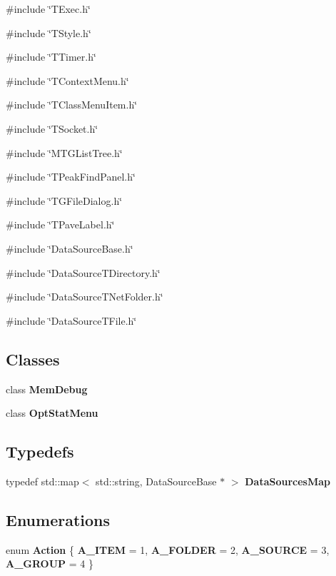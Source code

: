 {\ttfamily \#include \char`\"{}TExec.h\char`\"{}}\par
{\ttfamily \#include \char`\"{}TStyle.h\char`\"{}}\par
{\ttfamily \#include \char`\"{}TTimer.h\char`\"{}}\par
{\ttfamily \#include \char`\"{}TContextMenu.h\char`\"{}}\par
{\ttfamily \#include \char`\"{}TClassMenuItem.h\char`\"{}}\par
{\ttfamily \#include \char`\"{}TSocket.h\char`\"{}}\par
{\ttfamily \#include \char`\"{}MTGListTree.h\char`\"{}}\par
{\ttfamily \#include \char`\"{}TPeakFindPanel.h\char`\"{}}\par
{\ttfamily \#include \char`\"{}TGFileDialog.h\char`\"{}}\par
{\ttfamily \#include \char`\"{}TPaveLabel.h\char`\"{}}\par
{\ttfamily \#include \char`\"{}DataSourceBase.h\char`\"{}}\par
{\ttfamily \#include \char`\"{}DataSourceTDirectory.h\char`\"{}}\par
{\ttfamily \#include \char`\"{}DataSourceTNetFolder.h\char`\"{}}\par
{\ttfamily \#include \char`\"{}DataSourceTFile.h\char`\"{}}\par
\subsection*{Classes}
\begin{DoxyCompactItemize}
\item 
class {\bf MemDebug}
\item 
class {\bf OptStatMenu}
\end{DoxyCompactItemize}
\subsection*{Typedefs}
\begin{DoxyCompactItemize}
\item 
typedef std::map$<$ std::string, DataSourceBase $\ast$ $>$ {\bf DataSourcesMap}
\end{DoxyCompactItemize}
\subsection*{Enumerations}
\begin{DoxyCompactItemize}
\item 
enum {\bf Action} \{ {\bf A\_\-ITEM} =  1, 
{\bf A\_\-FOLDER} =  2, 
{\bf A\_\-SOURCE} =  3, 
{\bf A\_\-GROUP} =  4
 \}
\end{DoxyCompactItemize}
